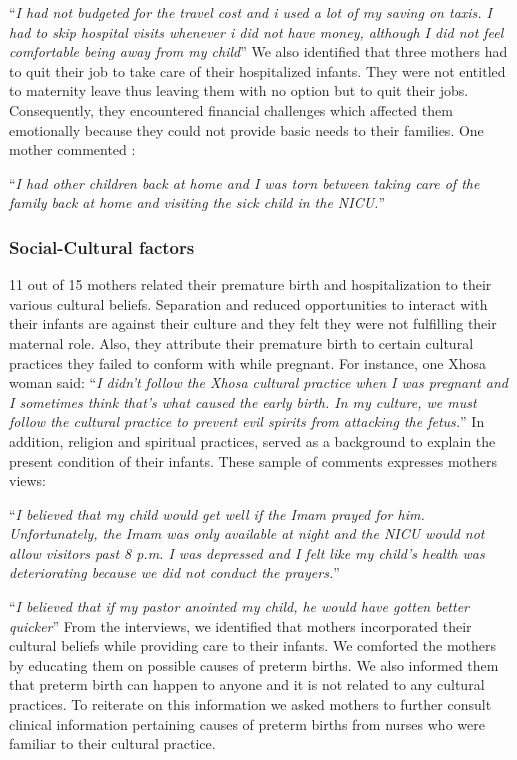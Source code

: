 \enquote{\itshape I had not budgeted for the travel cost and i used a lot of my saving on taxis. I had to skip hospital visits whenever  i did not have money, although I did not feel comfortable being away from my child} \bigbreak
We also identified that three mothers had to quit their job to take care of their hospitalized infants. They were not entitled to maternity leave thus leaving them with no option but to quit their jobs. Consequently, they encountered financial challenges which affected them emotionally because they could not provide basic needs to their families. One mother commented :

\enquote{\itshape I had other children back at home and I was torn between taking care of the family back at home and visiting the sick child in the NICU.}

\subsubsection{Social-Cultural factors}
11 out of 15 mothers related their premature birth and hospitalization to their various cultural beliefs. Separation and reduced opportunities to interact with their infants are against their culture and they felt they were not fulfilling their maternal role. Also, they attribute their premature birth to certain cultural practices they failed to conform with while pregnant. For instance, one Xhosa woman said:
\enquote{\itshape I didn't follow the Xhosa cultural practice when I was pregnant and I sometimes think that's what caused the early birth. In my culture, we must follow the cultural practice to prevent evil spirits from attacking the fetus.}
 In addition, religion and spiritual practices, served as a background to explain the present condition of their infants. These sample of comments expresses mothers views:
 
\enquote{\itshape I believed that my child would get well if the Imam prayed for him. Unfortunately, the Imam was only available at night and the NICU would not allow visitors past 8 p.m. I was depressed and I felt like my child's health was deteriorating because we did not conduct the prayers.} 

\enquote{\itshape I believed that if my pastor anointed my child, he would have gotten better quicker}
From the interviews, we identified that mothers incorporated their cultural beliefs while providing care to their infants. We comforted the mothers by educating them on possible causes of preterm births. We also informed them that preterm birth can happen to anyone and it is not related to any cultural practices. To reiterate on this information we asked mothers to further consult clinical information pertaining causes of preterm births from nurses who were familiar to their cultural practice.

